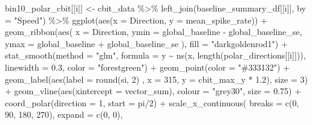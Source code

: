 \documentclass[
]{book}
\newenvironment{Shaded}{\begin{snugshade}}{\end{snugshade}}
\newcommand{\AttributeTok}[1]{\textcolor[rgb]{0.77,0.63,0.00}{#1}}
\newcommand{\DecValTok}[1]{\textcolor[rgb]{0.00,0.00,0.81}{#1}}
\newcommand{\FloatTok}[1]{\textcolor[rgb]{0.00,0.00,0.81}{#1}}
\newcommand{\FunctionTok}[1]{\textcolor[rgb]{0.00,0.00,0.00}{#1}}
\newcommand{\NormalTok}[1]{#1}
\newcommand{\OtherTok}[1]{\textcolor[rgb]{0.56,0.35,0.01}{#1}}
\newcommand{\SpecialCharTok}[1]{\textcolor[rgb]{0.00,0.00,0.00}{#1}}
\newcommand{\StringTok}[1]{\textcolor[rgb]{0.31,0.60,0.02}{#1}}
\begin{document}
\begin{Shaded}
\begin{Highlighting}[]
\NormalTok{  bin10\_polar\_cbit[[i]] }\OtherTok{\textless{}{-}}
\NormalTok{    cbit\_data }\SpecialCharTok{\%\textgreater{}\%}
    \FunctionTok{left\_join}\NormalTok{(baseline\_summary\_df[[i]], }\AttributeTok{by =} \StringTok{"Speed"}\NormalTok{) }\SpecialCharTok{\%\textgreater{}\%}
    \FunctionTok{ggplot}\NormalTok{(}\FunctionTok{aes}\NormalTok{(}\AttributeTok{x =}\NormalTok{ Direction, }\AttributeTok{y =}\NormalTok{ mean\_spike\_rate)) }\SpecialCharTok{+}
    \FunctionTok{geom\_ribbon}\NormalTok{(}\FunctionTok{aes}\NormalTok{(}
      \AttributeTok{x =}\NormalTok{ Direction,}
      \AttributeTok{ymin =}\NormalTok{ global\_baseline }\SpecialCharTok{{-}}\NormalTok{ global\_baseline\_se,}
      \AttributeTok{ymax =}\NormalTok{ global\_baseline }\SpecialCharTok{+}\NormalTok{ global\_baseline\_se}
\NormalTok{    ),}
    \AttributeTok{fill =} \StringTok{"darkgoldenrod1"}\NormalTok{) }\SpecialCharTok{+}
    \FunctionTok{stat\_smooth}\NormalTok{(}\AttributeTok{method =} \StringTok{"glm"}\NormalTok{,}
                \AttributeTok{formula =}\NormalTok{ y }\SpecialCharTok{\textasciitilde{}} \FunctionTok{ns}\NormalTok{(x, }\FunctionTok{length}\NormalTok{(polar\_directions[[i]])),}
                \AttributeTok{linewidth =} \FloatTok{0.3}\NormalTok{, }\AttributeTok{color =} \StringTok{"forestgreen"}\NormalTok{) }\SpecialCharTok{+}
    \FunctionTok{geom\_point}\NormalTok{(}\AttributeTok{color =} \StringTok{"\#333132"}\NormalTok{) }\SpecialCharTok{+}
    \FunctionTok{geom\_label}\NormalTok{(}\FunctionTok{aes}\NormalTok{(}\AttributeTok{label =} \FunctionTok{round}\NormalTok{(si, }\DecValTok{2}\NormalTok{) , }\AttributeTok{x =} \DecValTok{315}\NormalTok{, }\AttributeTok{y =}\NormalTok{ cbit\_max\_y }\SpecialCharTok{*} \FloatTok{1.2}\NormalTok{),}
               \AttributeTok{size =} \DecValTok{3}\NormalTok{) }\SpecialCharTok{+}
    \FunctionTok{geom\_vline}\NormalTok{(}\FunctionTok{aes}\NormalTok{(}\AttributeTok{xintercept =}\NormalTok{ vector\_sum), }\AttributeTok{colour =} \StringTok{"grey30"}\NormalTok{,}
               \AttributeTok{size =} \FloatTok{0.75}\NormalTok{) }\SpecialCharTok{+}
    \FunctionTok{coord\_polar}\NormalTok{(}\AttributeTok{direction =} \DecValTok{1}\NormalTok{, }\AttributeTok{start =}\NormalTok{ pi}\SpecialCharTok{/}\DecValTok{2}\NormalTok{) }\SpecialCharTok{+}
    \FunctionTok{scale\_x\_continuous}\NormalTok{(}
      \AttributeTok{breaks =} \FunctionTok{c}\NormalTok{(}\DecValTok{0}\NormalTok{, }\DecValTok{90}\NormalTok{, }\DecValTok{180}\NormalTok{, }\DecValTok{270}\NormalTok{),}
      \AttributeTok{expand =} \FunctionTok{c}\NormalTok{(}\DecValTok{0}\NormalTok{, }\DecValTok{0}\NormalTok{),}

\end{Highlighting}
\end{Shaded}
\end{document}
